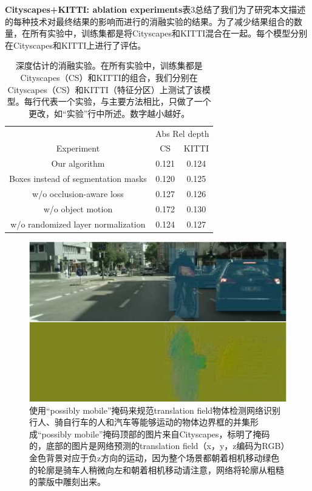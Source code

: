 \documentclass[10pt,journal,compsoc,UTF8]{IEEEtran}
\begin{document}
\textbf{Cityscapes+KITTI: ablation experiments}表3总结了我们为了研究本文描述的每种技术对最终结果的影响而进行的消融实验的结果。为了减少结果组合的数量，在所有实验中，训练集都是将Cityscapes和KITTI混合在一起。每个模型分别在Cityscapes和KITTI上进行了评估。
\begin{table}
  \centering
  \begin{tabular}{|c|c|c|}
  \hline
  &\multicolumn{2}{c|}{Abs Rel depth}\\
  Experiment& CS& KITTI\\
  \hline
  Our algorithm &0.121& 0.124\\
  \hline
  Boxes instead of segmentation masks& 0.120& 0.125\\
  w/o occlusion-aware loss& 0.127& 0.126\\
  w/o object motion& 0.172& 0.130\\
  w/o randomized layer normalization& 0.124& 0.127\\
  \hline
  \end{tabular}
  \caption{深度估计的消融实验。在所有实验中，训练集都是Cityscapes（CS）和KITTI的组合，我们分别在Cityscapes（CS）和KITTI（特征分区）上测试了该模型。每行代表一个实验，与主要方法相比，只做了一个更改，如“实验”行中所述。数字越小越好。}
\end{table}

\begin{figure}[htbp]
  \begin{framed} 
  \centering
    \includegraphics[width=1\linewidth]{imgs/4.png} 
  \caption{使用“possibly mobile”掩码来规范translation field物体检测网络识别行人、骑自行车的人和汽车等能够运动的物体边界框的并集形成“possibly mobile”掩码顶部的图片来自Cityscapes，标明了掩码的，底部的图片是网络预测的translation field（x，y，z编码为RGB）金色背景对应于负z方向的运动，因为整个场景都朝着相机移动绿色的轮廓是骑车人稍微向左和朝着相机移动请注意，网络将轮廓从粗糙的蒙版中雕刻出来。}
  \end{framed}
\end{figure}
\end{document}
